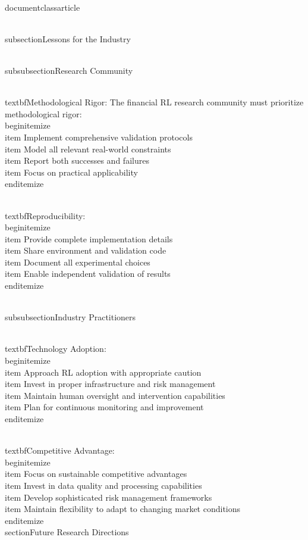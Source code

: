 \\documentclass{article}
\begin{document}
\\subsection{Lessons for the Industry}

\\subsubsection{Research Community}

\\textbf{Methodological Rigor}:
The financial RL research community must prioritize methodological rigor:
\\begin{itemize}
\\item Implement comprehensive validation protocols
\\item Model all relevant real-world constraints
\\item Report both successes and failures
\\item Focus on practical applicability
\\end{itemize}

\\textbf{Reproducibility}:
\\begin{itemize}
\\item Provide complete implementation details
\\item Share environment and validation code
\\item Document all experimental choices
\\item Enable independent validation of results
\\end{itemize}

\\subsubsection{Industry Practitioners}

\\textbf{Technology Adoption}:
\\begin{itemize}
\\item Approach RL adoption with appropriate caution
\\item Invest in proper infrastructure and risk management
\\item Maintain human oversight and intervention capabilities
\\item Plan for continuous monitoring and improvement
\\end{itemize}

\\textbf{Competitive Advantage}:
\\begin{itemize}
\\item Focus on sustainable competitive advantages
\\item Invest in data quality and processing capabilities
\\item Develop sophisticated risk management frameworks
\\item Maintain flexibility to adapt to changing market conditions
\\end{itemize}
\n\n
\\section{Future Research Directions}
\end{document}
